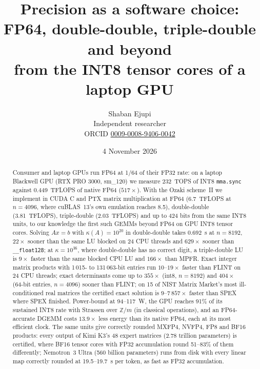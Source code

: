 \documentclass[11pt]{article}
\title{Precision as a software choice:\\FP64, double-double, triple-double and beyond\\from the INT8 tensor cores of a laptop GPU}
\author{Shaban Ejupi\\Independent researcher\\{\small ORCID \href{https://orcid.org/0009-0008-9406-0042}{0009-0008-9406-0042}}}
\date{4 November 2026}
\begin{document}
\maketitle

\begin{abstract}
Consumer and laptop GPUs run FP64 at 1/64 of their FP32 rate: on a laptop Blackwell GPU (RTX PRO 3000, sm\_120) we measure
232~TOPS of INT8 \texttt{mma.sync} against 0.449~TFLOPS of native FP64 ($517\times$). With the Ozaki scheme~II
we implement in CUDA C and PTX matrix multiplication at FP64 (6.7~TFLOPS at $n=4096$, where cuBLAS~13's own emulation reaches 8.5),
double-double (3.81~TFLOPS), triple-double (2.03~TFLOPS) and up to 424 bits from the same INT8 units, to our knowledge the
first such GEMMs beyond FP64 on GPU INT8 tensor cores. Solving $Ax=b$ with $\kappa(A)=10^{20}$ in double-double takes 0.692~s at
$n=8192$, $22\times$ sooner than the same LU blocked on 24 CPU threads and $629\times$ sooner than \texttt{\_\_float128}; at
$\kappa=10^{36}$, where double-double has no correct digit, a triple-double LU is $9\times$ faster than the same blocked CPU LU
and $166\times$ than MPFR. Exact integer matrix products with 1\,015- to
131\,063-bit entries run $10$--$19\times$ faster than FLINT on 24 CPU threads; exact determinants come up to $355\times$
(int8, $n=8192$) and $404\times$ (64-bit entries, $n=4096$) sooner than FLINT; on 15 of NIST Matrix Market's most ill-conditioned real
matrices the certified exact solution is $9$--$7\,857\times$ faster than SPEX where SPEX finished. Power-bound at
94--117~W, the GPU reaches 91\% of its sustained INT8 rate with Strassen over $\mathbb{Z}/m$ (in classical operations), and
an FP64-accurate DGEMM costs $13.9\times$ less energy than its native FP64, each at its most efficient clock. The same units
give correctly rounded MXFP4, NVFP4, FP8 and BF16 products: every output of Kimi K3's 48 expert matrices (2.78 trillion
parameters) is certified, where BF16 tensor cores with FP32 accumulation round 51--83\% of them differently; Nemotron~3
Ultra (560 billion parameters) runs from disk with every linear map correctly rounded at 19.5--19.7~s per token, as fast as FP32
accumulation.
\end{abstract}
\end{document}
